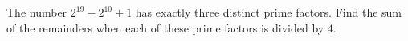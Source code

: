 The number $2^{19}-2^{10}+1$ has exactly three distinct prime factors. Find the sum of the remainders when each of these prime factors is divided by $4$.
